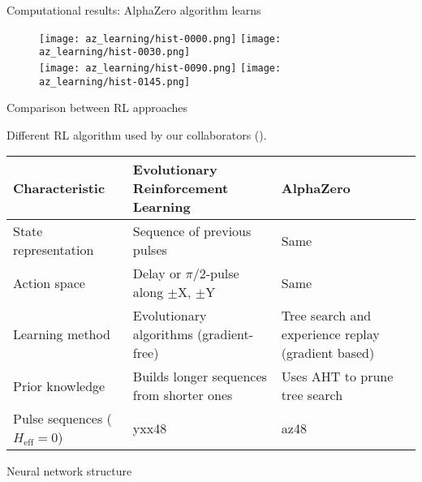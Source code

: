 \documentclass{beamer}
\begin{document}
\begin{frame}{Computational results: AlphaZero algorithm learns}

\begin{figure}
\centering
\texttt{[image: az\_learning/hist-0000.png]}
\texttt{[image: az\_learning/hist-0030.png]} \\
\texttt{[image: az\_learning/hist-0090.png]}
\texttt{[image: az\_learning/hist-0145.png]}
\end{figure}

\end{frame}

\begin{frame}{Comparison between RL approaches}

Different RL algorithm used by our collaborators (\cite{peng2021deep}).

\begin{table}
\centering
\begin{footnotesize}
\begin{tabular}{p{}|p{}|p{}}
    Characteristic & Evolutionary Reinforcement Learning & AlphaZero \\
    \hline
    State representation & Sequence of previous pulses & Same \\
    \hline
    Action space & Delay or $\pi/2$-pulse along $\pm$X, $\pm$Y & Same \\
    \hline
    Learning method & Evolutionary algorithms (gradient-free) & Tree search and experience replay (gradient based) \\
    \hline
    Prior knowledge & Builds longer sequences from shorter ones & Uses AHT to prune tree search \\
    \hline
    Pulse sequences ($H_\text{eff} = 0$) & yxx48 & az48
\end{tabular}
\end{footnotesize}
\end{table}

\end{frame}

\begin{frame}{Neural network structure}

\begin{figure}
\centering
\scalebox{.6}{

}
\end{figure}

\end{frame}
\end{document}
